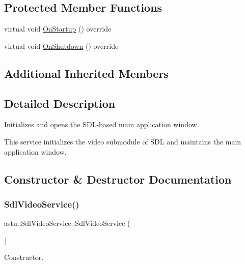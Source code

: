 \subsection*{Protected Member Functions}
\begin{DoxyCompactItemize}
\item 
virtual void \hyperlink{classastu_1_1SdlVideoService_add229ac2af59a4aea090e4de4c67e530}{On\+Startup} () override
\item 
virtual void \hyperlink{classastu_1_1SdlVideoService_a6d6085e9ff213c5d41546d604ff53e92}{On\+Shutdown} () override
\end{DoxyCompactItemize}
\subsection*{Additional Inherited Members}


\subsection{Detailed Description}
Initializes and opens the S\+D\+L-\/based main application window.

This service initializes the video submodule of S\+DL and maintains the main application window. 

\subsection{Constructor \& Destructor Documentation}
\mbox{\label{classastu_1_1SdlVideoService_a21f04798e41b0c5c083acc1eefcbb5c1}} 
\subsubsection{\texorpdfstring{Sdl\+Video\+Service()}{SdlVideoService()}}
{\footnotesize\ttfamily astu\+::\+Sdl\+Video\+Service\+::\+Sdl\+Video\+Service (\begin{DoxyParamCaption}{ }\end{DoxyParamCaption})}

Constructor. \mbox{\label{classastu_1_1SdlVideoService_a5ab48fd8569c517151099d71a86cc0b5}} 
